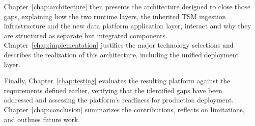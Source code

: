 Chapter~\ref{chap:architecture} then presents the architecture designed to close those gaps, explaining how
the two runtime layers, the inherited TSM ingestion infrastructure and the new
data platform application layer, interact and why they are structured as separate but integrated components.
Chapter~\ref{chap:implementation} justifies the major technology selections and describes the
realization of this architecture, including the unified deployment layer.

Finally, Chapter~\ref{chap:testing} evaluates the resulting platform against the requirements defined earlier,
verifying that the identified gaps have been addressed and assessing the platform's readiness for production
deployment.
Chapter~\ref{chap:conclusion} summarizes the contributions, reflects on limitations, and outlines future work.
